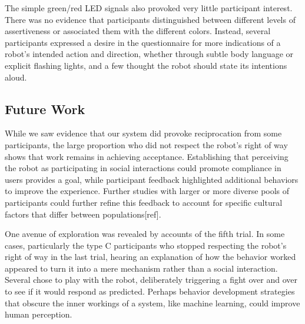 \documentclass[letterpaper, 10 pt, conference]{ieeeconf}  %
\begin{document}
The simple green/red LED signals also provoked very little participant interest. There was no evidence that participants distinguished between different levels of assertiveness or associated them with the different colors. Instead, several participants expressed a desire in the questionnaire for more indications of a robot’s intended action and direction, whether through subtle body language or explicit flashing lights, and a few thought the robot should state its intentions aloud. 

\subsection{Future Work}
While we saw evidence that our system did provoke reciprocation from some participants, the large proportion who did not respect the robot's right of way shows that work remains in achieving acceptance. Establishing that perceiving the robot as participating in social interactions could promote compliance in users provides a goal, while participant feedback highlighted additional behaviors to improve the experience. Further studies with larger or more diverse pools of participants could further refine this feedback to account for specific cultural factors that differ between populations[ref].


One avenue of exploration was revealed by accounts of the fifth trial. In some cases, particularly the type C participants who stopped respecting the robot's right of way in the last trial, hearing an explanation of how the behavior worked appeared to turn it into a mere mechanism rather than a social interaction. Several chose to play with the robot, deliberately triggering a fight over and over to see if it would respond as predicted. Perhaps behavior development strategies that obscure the inner workings of a system, like machine learning, could improve human perception.
\end{document}
